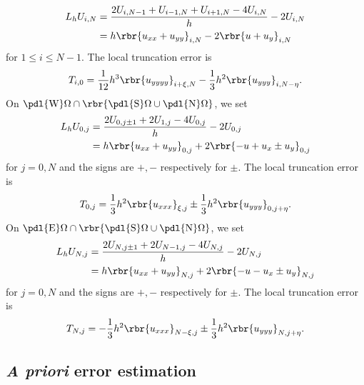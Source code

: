 \documentclass[english, nochinese]{pnote}
\begin{document}
\begin{equation}
\begin{split}
L_h U_{ i, N } &= \frac{ 2 U_{ i, N - 1 } + U_{ i - 1, N } + U_{ i + 1, N } - 4 U_{ i, N } }{h} - 2 U_{ i, N } \\
&= h \rbr{ u_{ x x } + u_{ y y } }_{ i, N } - 2 \rbr{ u + u_y }_{ i, N }
\end{split}
\end{equation}
for $ 1 \le i \le N - 1 $. The local truncation error is
\begin{equation}
T_{ i, 0 } = \frac{1}{12} h^3 \rbr{u_{ y y y y }}_{ i + \xi, N } - \frac{1}{3} h^2 \rbr{u_{ y y y }}_{ i, N - \eta }.
\end{equation}
On $ \pdl{\text{W}} \Omega \cap \rbr{ \pdl{\text{S}} \Omega \cup \pdl{\text{N}} \Omega } $, we set
\begin{equation}
\begin{split}
L_h U_{ 0, j } &= \frac{ 2 U_{ 0, j \pm 1 } + 2 U_{ 1, j } - 4 U_{ 0, j } }{h} - 2 U_{ 0, j } \\
&= h \rbr{ u_{ x x } + u_{ y y } }_{ 0, j } + 2 \rbr{ -u + u_x \pm u_y }_{ 0, j }
\end{split}
\end{equation}
for $ j = 0, N $ and the signs are $ +, - $ respectively for $\pm$.
The local truncation error is
\begin{equation}
T_{ 0, j } = \frac{1}{3} h^2 \rbr{u_{ x x x }}_{ \xi, j } \pm \frac{1}{3} h^2 \rbr{u_{ y y y }}_{ 0, j + \eta }.
\end{equation}
On $ \pdl{\text{E}} \Omega \cap \rbr{ \pdl{\text{S}} \Omega \cup \pdl{\text{N}} \Omega } $, we set
\begin{equation}
\begin{split}
L_h U_{ N, j } &= \frac{ 2 U_{ N, j \pm 1 } + 2 U_{ N - 1, j } - 4 U_{ N, j } }{h} - 2 U_{ N, j } \\
&= h \rbr{ u_{ x x } + u_{ y y } }_{ N, j } + 2 \rbr{ -u - u_x \pm u_y }_{ N, j }
\end{split}
\end{equation}
for $ j = 0, N $ and the signs are $ +, - $ respectively for $\pm$.
The local truncation error is
\begin{equation}
T_{ N, j } = -\frac{1}{3} h^2 \rbr{u_{ x x x }}_{ N - \xi, j } \pm \frac{1}{3} h^2 \rbr{u_{ y y y }}_{ N, j + \eta }.
\end{equation}

\subsection{\textit{A priori} error estimation}
\end{document}
